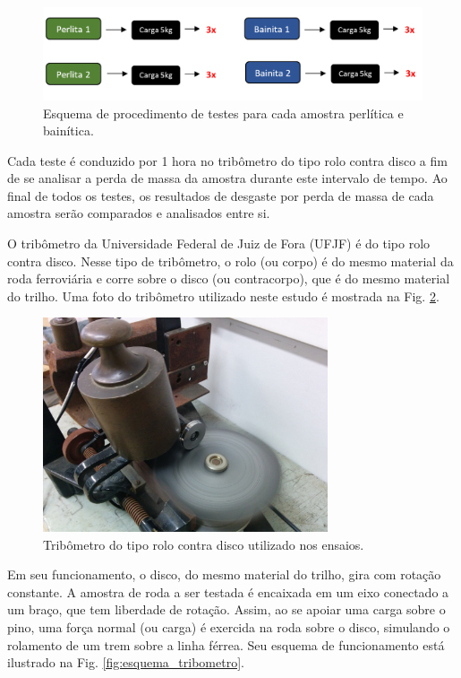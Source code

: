 \documentclass[
12pt,
openany, %
oneside, %
a4paper,			
english,			
brazil			        %
]{abntbibufjf}
\begin{document}
	\begin{figure}[H]
		\centering
		\includegraphics[width=1\textwidth]{esquema_teste}
		\caption{Esquema de procedimento de testes para cada amostra perlítica e bainítica.}
		\label{fig:esquema_teste}
	\end{figure}

	Cada teste é conduzido por 1 hora no tribômetro do tipo rolo contra disco a fim de se analisar a perda de massa da amostra durante este intervalo de tempo. Ao final de todos os testes, os resultados de desgaste por perda de massa de cada amostra serão comparados e analisados entre si.
	
	O tribômetro da Universidade Federal de Juiz de Fora (UFJF) é do tipo rolo contra disco. Nesse tipo de tribômetro, o rolo (ou corpo) é do mesmo material da roda ferroviária e corre sobre o disco (ou contracorpo), que é do mesmo material do trilho. Uma foto do tribômetro utilizado neste estudo é mostrada na Fig. \ref{fig:tribometro}.
	
	\begin{figure}[H]
		\centering
		\includegraphics[width=0.75\textwidth]{tribometro}
		\caption{Tribômetro do tipo rolo contra disco utilizado nos ensaios.}
		\label{fig:tribometro}
	\end{figure}

	Em seu funcionamento, o disco, do mesmo material do trilho, gira com rotação constante. A amostra de roda a ser testada é encaixada em um eixo conectado a um braço, que tem liberdade de rotação. Assim, ao se apoiar uma carga sobre o pino, uma força normal (ou carga) é exercida na roda sobre o disco, simulando o rolamento de um trem sobre a linha férrea. Seu esquema de funcionamento está ilustrado na Fig. \ref{fig:esquema_tribometro}.
	
\end{document}
